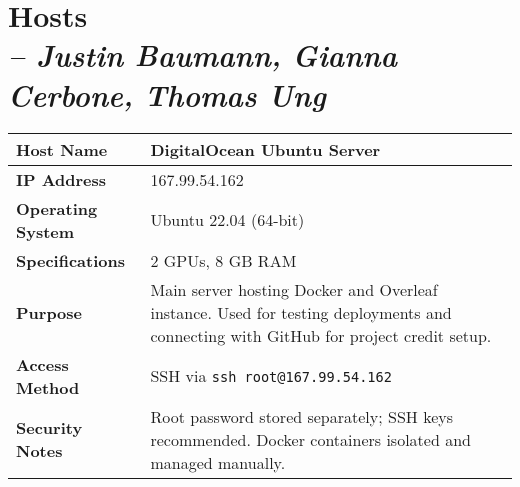 \chapter{Hosts \\
\small{\textit{-- Justin Baumann, Gianna Cerbone, Thomas Ung}}
\label{Chapter::Hosts}}

\small
\begin{longtable}{|p{3cm}|p{10cm}|}
\hline
\textbf{Host Name} & DigitalOcean Ubuntu Server \\ \hline
\textbf{IP Address} & 167.99.54.162 \\ \hline
\textbf{Operating System} & Ubuntu 22.04 (64-bit) \\ \hline
\textbf{Specifications} & 2 GPUs, 8 GB RAM \\ \hline
\textbf{Purpose} & Main server hosting Docker and Overleaf instance. Used for testing deployments and connecting with GitHub for project credit setup. \\ \hline
\textbf{Access Method} & SSH via \texttt{ssh root@167.99.54.162} \\ \hline
\textbf{Security Notes} & Root password stored separately; SSH keys recommended. Docker containers isolated and managed manually. \\ \hline
\end{longtable}
